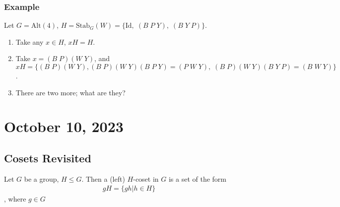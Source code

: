 \documentclass[11pt]{article}
\newcommand{\0}{\emptyset}
\begin{document}
\subsubsection*{Example}
\label{sec:orge1a2509}
Let \(G=\text{Alt}(4)\), \(H=\text{Stab}_{G}(W)=\{\text{Id},\;(B\;P\;Y),\;(B\;Y\;P)\}\).\\[0pt]
\begin{enumerate}
\item Take any \(x\in H\), \(xH=H\).\\[0pt]
\item Take \(x=(B\;P)(W\;Y)\), and \(xH=\{(B\;P)(W\;Y),(B\;P)(W\;Y)(B\;P\;Y)=(P\;W\;Y),\;(B\;P)(W\;Y)(B\;Y\;P)=(B\;W\;Y)\}\).\\[0pt]
\item There are two more; what are they?\\[0pt]
\end{enumerate}
\section*{October 10, 2023}
\label{sec:orge056c5a}
\subsection*{Cosets Revisited}
\label{sec:org4b9f5c1}
Let \(G\) be a group, \(H\leq G\). Then a (left) \(H\)-coset in \(G\) is a set of the form\\[0pt]
\begin{align*}
    gH = \{gh|h\in H\}
\end{align*}
, where \(g\in G\)\\[0pt]
\end{document}
